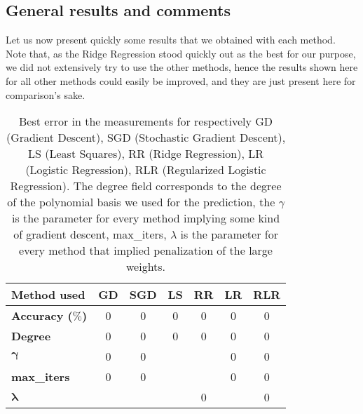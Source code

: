 \documentclass[10pt,conference,compsocconf]{IEEEtran}
\begin{document}
\subsection{General results and comments}
Let us now present quickly some results that we obtained with each method. Note that, as the Ridge Regression stood quickly out as the best for our purpose, we did not extensively try to use the other methods, hence the results shown here for all other methods could easily be improved, and they are just present here for comparison's sake.
\begin{table}[!h]
	\centering
	\begin{tabular}{l||c|c|c|c|c|c}
		\textbf{Method used} & GD & SGD & LS & RR & LR & RLR  \\
		\hline
		\textbf{Accuracy ($\%$)} & 0&0&0&0&0&0\\
		\hline
		\textbf{Degree} & 0 &0&0&0&0&0\\
		\hline
		$\mathbf{\gamma}$ & 0&0&\diagbox{}&\diagbox{}&0&0\\
		\hline
		\textbf{max\_iters} & 0&0&\diagbox{}&\diagbox{}&0&0\\
		\hline
		$\mathbf{\lambda}$ & \diagbox{}&\diagbox{}&\diagbox{}&0&\diagbox{}&0\\
		
		
	\end{tabular}
	\caption{Best error in the measurements for respectively GD (Gradient Descent), SGD (Stochastic Gradient Descent), LS (Least Squares), RR (Ridge Regression), LR (Logistic Regression), RLR (Regularized Logistic Regression). The degree field corresponds to the degree of the polynomial basis we used for the prediction, the $\gamma$ is the parameter for every method implying some kind of gradient descent, max\_iters, $\lambda$ is the parameter for every method that implied penalization of the large weights.}
	\label{tab:results}
\end{table}
\end{document}
